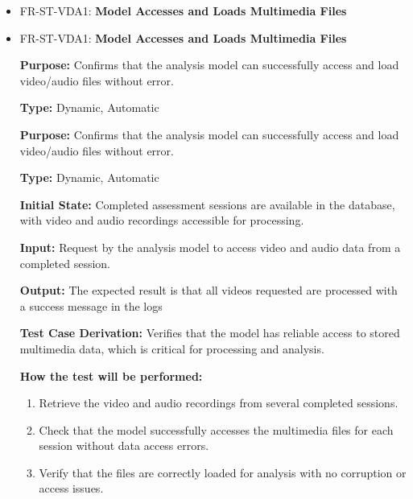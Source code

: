 \documentclass[12pt, titlepage]{article}
\begin{document}
\begin{itemize}
  \item FR-ST-VDA1: \textbf{Model Accesses and Loads Multimedia Files}
  \item FR-ST-VDA1: \textbf{Model Accesses and Loads Multimedia Files}
  \begin{mdframed}[linewidth=0.5mm]
      \textbf{Purpose:} Confirms that the analysis model can successfully access and load video/audio files without error. \par
      \textbf{Type:} Dynamic, Automatic \par
      \textbf{Purpose:} Confirms that the analysis model can successfully access and load video/audio files without error. \par
      \textbf{Type:} Dynamic, Automatic \par
      \textbf{Initial State:} Completed assessment sessions are available in the database, with video and audio recordings accessible for processing. \par
      \textbf{Input:} Request by the analysis model to access video and audio data from a completed session. \par
      \textbf{Output:} The expected result is that all videos requested are processed with a success message in the logs \par
      \textbf{Test Case Derivation:} Verifies that the model has reliable access to stored multimedia data, which is critical for processing and analysis. \par
      \textbf{How the test will be performed:}
      \begin{enumerate}[noitemsep]
        \item Retrieve the video and audio recordings from several completed sessions.
        \item Check that the model successfully accesses the multimedia files for each session without data access errors.
        \item Verify that the files are correctly loaded for analysis with no corruption or access issues.
      \end{enumerate}
  \end{mdframed}


\end{itemize}
\end{document}
